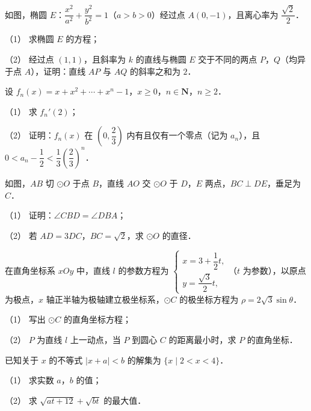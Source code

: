 \begin{question}
如图，椭圆 $E$：$\dfrac{x^{2}}{a^{2}}+\dfrac{y^{2}}{b^{2}}=1$（$a>b>0$）经过点 $A(0,-1)$，且离心率为 $\dfrac{\sqrt{2}}{2}$．

（1） 求椭圆 $E$ 的方程；

（2） 经过点 $(1,1)$，且斜率为 $k$ 的直线与椭圆 $E$ 交于不同的两点 $P$，$Q$（均异于点 $A$），证明：直线 $AP$ 与 $AQ$ 的斜率之和为 $2$．
\nopagebreak[4]
\begin{center}\end{center}
\nopagebreak[4]
\end{question}
\begin{question}
设 $f_{n}(x)=x+x^{2}+\cdots+x^{n}-1$，$x\ge 0$，$n\in\mathbf{N}$，$n\ge 2$．

（1） 求 $f_{n}'(2)$；

（2） 证明：$f_{n}(x)$ 在 $\left(0,\dfrac{2}{3}\right)$ 内有且仅有一个零点（记为 $a_{n}$），且 $0<a_{n}-\dfrac{1}{2}<\dfrac{1}{3}\left(\dfrac{2}{3}\right)^{n}$．

\Needspace{0.4\textheight}
\end{question}
\begin{question}
如图，$AB$ 切 $\odot O$ 于点 $B$，直线 $AO$ 交 $\odot O$ 于 $D$，$E$ 两点，$BC\perp DE$，垂足为 $C$．

（1） 证明：$\angle CBD=\angle DBA$；

（2） 若 $AD=3DC$，$BC=\sqrt{2}$，求 $\odot O$ 的直径．
\nopagebreak[4]
\begin{center}\end{center}
\nopagebreak[4]
\end{question}
\begin{question}
在直角坐标系 $xOy$ 中，直线 $l$ 的参数方程为 $\begin{cases}x=3+\dfrac{1}{2}t,\\[4pt] y=\dfrac{\sqrt{3}}{2}t,\end{cases}$（$t$ 为参数），以原点为极点，$x$ 轴正半轴为极轴建立极坐标系，$\odot C$ 的极坐标方程为 $\rho=2\sqrt{3}\sin\theta$．

（1） 写出 $\odot C$ 的直角坐标方程；

（2） $P$ 为直线 $l$ 上一动点，当 $P$ 到圆心 $C$ 的距离最小时，求 $P$ 的直角坐标．

\end{question}
\begin{question}
已知关于 $x$ 的不等式 $|x+a|<b$ 的解集为 $\{x\mid 2<x<4\}$．

（1） 求实数 $a$，$b$ 的值；

（2） 求 $\sqrt{at+12}+\sqrt{bt}$ 的最大值．

\end{question}